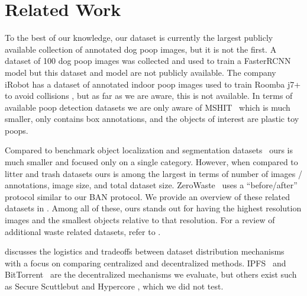 \documentclass{article}
\begin{document}
\section{Related Work}
\label{sec:relatedwork}

To the best of our knowledge, our dataset is currently the largest publicly available collection of
  annotated dog poop images, but it is not the first.
A dataset of 100 dog poop images was collected and used to train a FasterRCNN model
  \cite{neeraj_madan_dog_2019} but this dataset and model are not publicly available.
The company iRobot has a dataset of annotated indoor poop images used to train Roomba j7+ to avoid
  collisions \cite{roomba_2021}, but as far as we are aware, this is not available.
In terms of available poop detection datasets we are only aware of MSHIT~\cite{mshit_2020} which is much
  smaller, only contains box annotations, and the objects of interest are plastic toy poops.

Compared to benchmark object localization and segmentation datasets~\cite{ILSVRC15,
  lin_microsoft_2014,cordts2015cityscapes} ours is much smaller and focused only on a single category.
However, when compared to litter and trash datasets
  \cite{bashkirova_zerowaste_2022,proenca_taco_2020,hong2020trashcansemanticallysegmenteddatasetvisual,mittal2016spotgarbage,rs13050965}
  ours is among the largest in terms of number of images / annotations, image size, and total dataset size.
ZeroWaste~\cite{bashkirova_zerowaste_2022} uses a ``before/after'' protocol similar to our BAN protocol.
We provide an overview of these related datasets in .
Among all of these, ours stands out for having the highest resolution images and the smallest objects
  relative to that resolution.
For a review of additional waste related datasets, refer to \cite{agnieszka_waste}.

 discusses the logistics and tradeoffs between dataset distribution mechanisms
  with a focus on comparing centralized and decentralized methods.
IPFS~\cite{benet_ipfs_2014} and BitTorrent~\cite{cohen_incentives_2003} are the decentralized 
  mechanisms we evaluate, but others exist such as Secure Scuttlebut \cite{tarr_secure_2019} and Hypercore
  \cite{frazee_dep-0002_nodate}, which we did not test.

\end{document}
